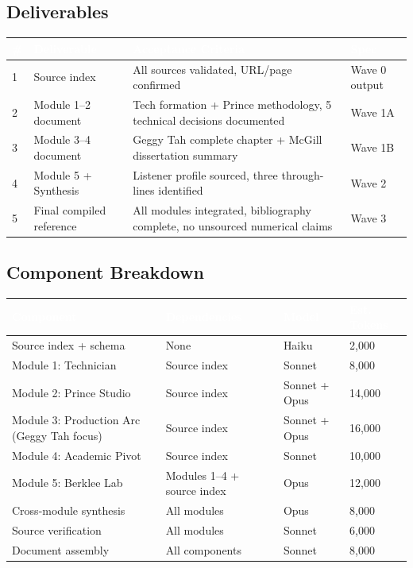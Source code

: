 \documentclass[11pt,letterpaper]{article}
\newcommand{\tableheader}[1]{\textbf{\sffamily\textcolor{white}{#1}}}
\begin{document}
\subsection{Deliverables}

\begin{center}
\begin{tabularx}{\textwidth}{C{0.5cm}L{4cm}L{4cm}X}
\toprule
{}
\tableheader{\#} & \tableheader{Deliverable} & \tableheader{Acceptance Criteria} & \tableheader{Spec} \\
 & Source index & All sources validated, URL/page confirmed & Wave 0 output \\
2 & Module 1--2 document & Tech formation + Prince methodology, 5 technical decisions documented & Wave 1A \\
3 & Module 3--4 document & Geggy Tah complete chapter + McGill dissertation summary & Wave 1B \\
4 & Module 5 + Synthesis & Listener profile sourced, three through-lines identified & Wave 2 \\
5 & Final compiled reference & All modules integrated, bibliography complete, no unsourced numerical claims & Wave 3 \\
\bottomrule
\end{tabularx}
\end{center}

\subsection{Component Breakdown}

\begin{center}
\begin{tabularx}{\textwidth}{L{4cm}L{2.5cm}C{2cm}C{2cm}}
\toprule
{}
\tableheader{Component} & \tableheader{Dependencies} & \tableheader{Model} & \tableheader{Est. Tokens} \\
\midrule
Source index + schema & None & Haiku & 2,000 \\
Module 1: Technician & Source index & Sonnet & 8,000 \\
Module 2: Prince Studio & Source index & Sonnet + Opus & 14,000 \\
Module 3: Production Arc (Geggy Tah focus) & Source index & Sonnet + Opus & 16,000 \\
Module 4: Academic Pivot & Source index & Sonnet & 10,000 \\
Module 5: Berklee Lab & Modules 1--4 + source index & Opus & 12,000 \\
Cross-module synthesis & All modules & Opus & 8,000 \\
Source verification & All modules & Sonnet & 6,000 \\
Document assembly & All components & Sonnet & 8,000 \\
\bottomrule
\end{tabularx}
\end{center}
\end{document}
